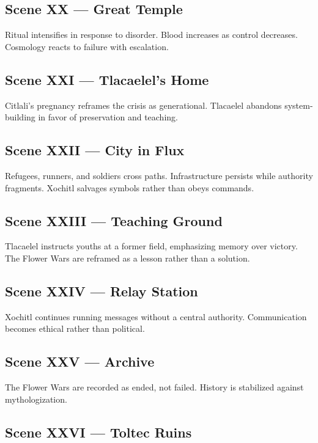 \documentclass[12pt]{article}
\begin{document}
\subsection*{Scene XX — Great Temple}

Ritual intensifies in response to disorder. Blood increases as control decreases. Cosmology reacts to failure with escalation.

\subsection*{Scene XXI — Tlacaelel's Home}

Citlali's pregnancy reframes the crisis as generational. Tlacaelel abandons system-building in favor of preservation and teaching.

\subsection*{Scene XXII — City in Flux}

Refugees, runners, and soldiers cross paths. Infrastructure persists while authority fragments. Xochitl salvages symbols rather than obeys commands.

\subsection*{Scene XXIII — Teaching Ground}

Tlacaelel instructs youths at a former field, emphasizing memory over victory. The Flower Wars are reframed as a lesson rather than a solution.

\subsection*{Scene XXIV — Relay Station}

Xochitl continues running messages without a central authority. Communication becomes ethical rather than political.

\subsection*{Scene XXV — Archive}

The Flower Wars are recorded as ended, not failed. History is stabilized against mythologization.

\subsection*{Scene XXVI — Toltec Ruins}
\end{document}
